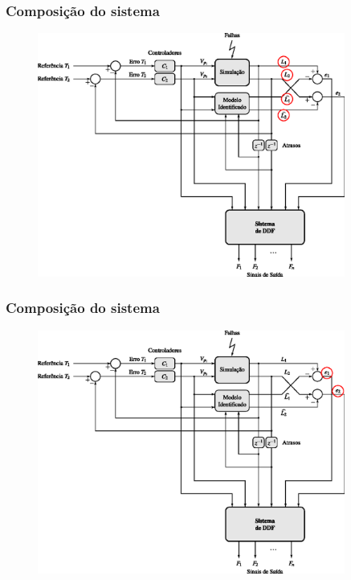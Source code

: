 \documentclass{beamer}
\begin{document}
\begin{frame}
    \frametitle{Composição do sistema}

\begin{figure}[htb]
\centering
    \includegraphics[width=0.9\textwidth]{imgs/sistema/eps/composicao_mod_5}
\end{figure}
\end{frame}

\begin{frame}
    \frametitle{Composição do sistema}

\begin{figure}[htb]
\centering
    \includegraphics[width=0.9\textwidth]{imgs/sistema/eps/composicao_mod_6}
\end{figure}
\end{frame}
\end{document}
